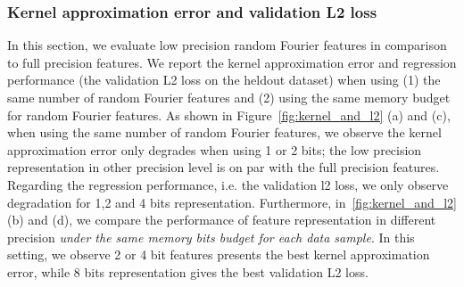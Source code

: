\subsubsection{Kernel approximation error and validation L2 loss}
In this section, we evaluate low precision random Fourier features in comparison to full precision features. We report the kernel approximation error and regression performance (the validation L2 loss on the heldout dataset) when using (1) the same number of random Fourier features and (2) using the same memory budget for random Fourier features.
As shown in Figure~\ref{fig:kernel_and_l2} (a) and (c), when using the same number of random Fourier features, we observe the kernel approximation error only degrades when using 1 or 2 bits; the low precision representation in other precision level is on par with the full precision features. Regarding the regression performance, i.e. the validation l2 loss, we only observe degradation for 1,2 and 4 bits representation.
Furthermore, in~\ref{fig:kernel_and_l2} (b) and (d), we compare the performance of feature representation in different precision \emph{under the same memory bits budget for each data sample}. In this setting, we observe 2 or 4 bit features presents the best kernel approximation error, while 8 bits representation gives the best validation L2 loss.


